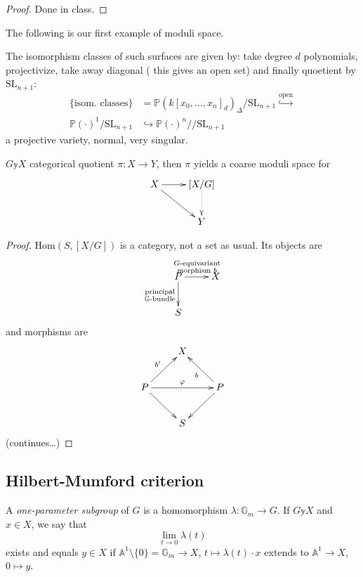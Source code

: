 \begin{proof}
Done in class.
\end{proof}

The following is our first example of moduli space.

\begin{example}
\label{example-smooth-hypersurfaces}
The isomorphism classes of such surfaces are given by: take degree $d$
polynomials, projectivize, take away diagonal ( this gives an open set) and
finally quoetient by $\text{SL}_{n+1}$:
\begin{align*}
\{\text{isom. classes}\}&=\mathbb{P}(k[x_0,\ldots,x_n]_d)_{\Delta}
/\text{SL}_{n+1}\overset{\text{open}}{\hookrightarrow }\\
\mathbb{P}(\cdot)^1/\text{SL}_{n+1}& \hookrightarrow  
\mathbb{P}(\cdot)^n//\text{SL}_{n+1}
\end{align*}
a projective variety, normal, very singular.
\end{example}

\begin{remark}
\label{remark-categorial-quotient-yields-coarse-moduli-space}
$G \mathbb{y} X$ categorical quotient $\pi:X \to Y$, then $\pi$ yields a coarse
moduli space for
$$
\xymatrix{
X\ar[r]\ar[rd]& [X/G]\ar@{.>}[d]\\
&Y
}
$$
\end{remark}

\begin{proof}
$\text{Hom}(S,[X/G])$ is a category, not a set as usual. Its objects are
$$
\xymatrix{
P\ar[d]_{\substack{\text{principal} \\ \mathbb{G}\text{-bundle}}}
\ar[r]^{\substack{G\text{-equivariant} \\ \text{morphism }b}}&X\\
S
}
$$
and morphisms are
$$
\xymatrix{
&X\\
P\ar[ur]^{b'}\ar[rr]^\varphi \ar[dr]&  &  P\ar[ul]^b\ar[dl]\\
&S
}
$$
(continues…)
\end{proof}

\subsection{Hilbert-Mumford criterion}
\label{subsection-Hilbert-Mumford-criterion}

\begin{definition}
\label{definition-one-parameter-subgroup}
A {\it one-parameter subgroup} of  $G$ is a homomorphism
$\lambda:\mathbb{G}_m \to G$. If $G \mathbb{y} X$ and $x \in X$, we say that
$$
\lim_{t \to 0}\lambda(t) 
$$
exists and equals $y \in X$ if $\mathbb{A}^1\setminus\{0\}=\mathbb{G}_m \to X$,
$t \mapsto \lambda(t)\cdot x$ extends to $\mathbb{A}^1 \to X$, $0 \mapsto y$.
\end{definition}

